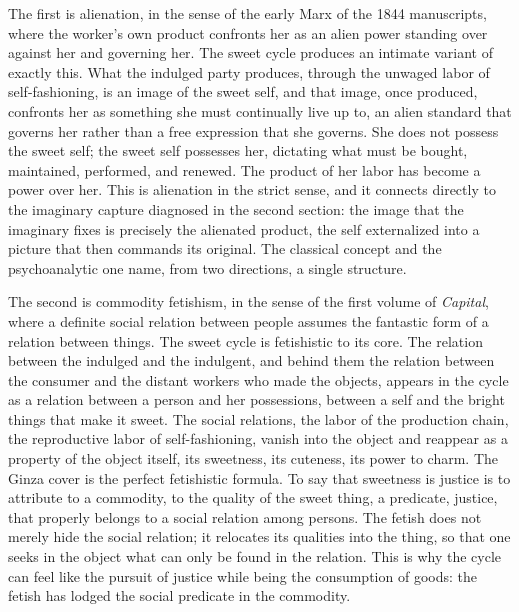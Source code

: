 The first is alienation, in the sense of the early Marx of the 1844 manuscripts, where the worker's own product confronts her as an alien power standing over against her and governing her. The sweet cycle produces an intimate variant of exactly this. What the indulged party produces, through the unwaged labor of self-fashioning, is an image of the sweet self, and that image, once produced, confronts her as something she must continually live up to, an alien standard that governs her rather than a free expression that she governs. She does not possess the sweet self; the sweet self possesses her, dictating what must be bought, maintained, performed, and renewed. The product of her labor has become a power over her. This is alienation in the strict sense, and it connects directly to the imaginary capture diagnosed in the second section: the image that the imaginary fixes is precisely the alienated product, the self externalized into a picture that then commands its original. The classical concept and the psychoanalytic one name, from two directions, a single structure.

The second is commodity fetishism, in the sense of the first volume of \textit{Capital}, where a definite social relation between people assumes the fantastic form of a relation between things. The sweet cycle is fetishistic to its core. The relation between the indulged and the indulgent, and behind them the relation between the consumer and the distant workers who made the objects, appears in the cycle as a relation between a person and her possessions, between a self and the bright things that make it sweet. The social relations, the labor of the production chain, the reproductive labor of self-fashioning, vanish into the object and reappear as a property of the object itself, its sweetness, its cuteness, its power to charm. The Ginza cover is the perfect fetishistic formula. To say that sweetness is justice is to attribute to a commodity, to the quality of the sweet thing, a predicate, justice, that properly belongs to a social relation among persons. The fetish does not merely hide the social relation; it relocates its qualities into the thing, so that one seeks in the object what can only be found in the relation. This is why the cycle can feel like the pursuit of justice while being the consumption of goods: the fetish has lodged the social predicate in the commodity.

